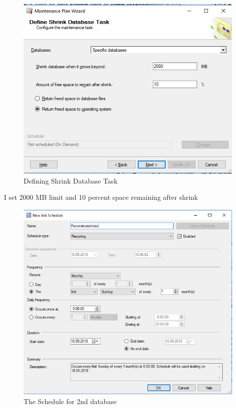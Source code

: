 \documentclass[12pt]{article}
\begin{document}
        
        \begin{figure}[H]
                \centering
                \includegraphics[width=.95\textwidth]{img9.png}
                \caption{Defining Shrink Database Task}
        \end{figure}
        \vspace{0.5 cm}
        I set 2000 MB limit and 10 percent space remaining after shrink
        
        \begin{figure}[H]
                \centering
                \includegraphics[width=.95\textwidth]{img10.png}
                \caption{The Schedule for 2nd database}
        \end{figure}
        \vspace{0.5 cm}
\end{document}
